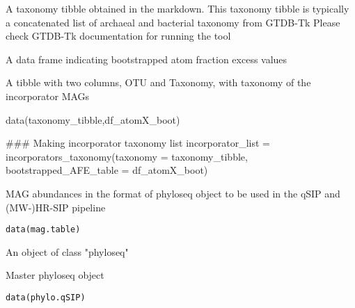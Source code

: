 \documentclass[a4paper]{book}
\begin{document}
%
\begin{Arguments}
\begin{ldescription}
\item[\code{taxonomy}] A taxonomy tibble obtained in the markdown. This taxonomy tibble is
typically a concatenated list of archaeal and bacterial taxonomy from GTDB-Tk
Please check GTDB-Tk documentation for running the tool

\item[\code{bootstrapped\_AFE\_table}] A data frame indicating bootstrapped atom fraction excess values
\end{ldescription}
\end{Arguments}
%
\begin{Value}
A tibble with two columns, OTU and Taxonomy, with taxonomy of the incorporator MAGs
\end{Value}
%
\begin{Examples}
\begin{ExampleCode}
data(taxonomy_tibble,df_atomX_boot)



### Making incorporator taxonomy list
incorporator_list = incorporators_taxonomy(taxonomy = taxonomy_tibble,
         bootstrapped_AFE_table = df_atomX_boot)


\end{ExampleCode}
\end{Examples}
%
\begin{Description}\relax
MAG abundances in the format of phyloseq object to be used in the qSIP and (MW-)HR-SIP pipeline
\end{Description}
%
\begin{Usage}
\begin{verbatim}
data(mag.table)
\end{verbatim}
\end{Usage}
%
\begin{Format}
An object of class "phyloseq"
\end{Format}
%
\begin{Description}\relax
Master phyloseq object
\end{Description}
%
\begin{Usage}
\begin{verbatim}
data(phylo.qSIP)
\end{verbatim}
\end{Usage}
\end{document}
